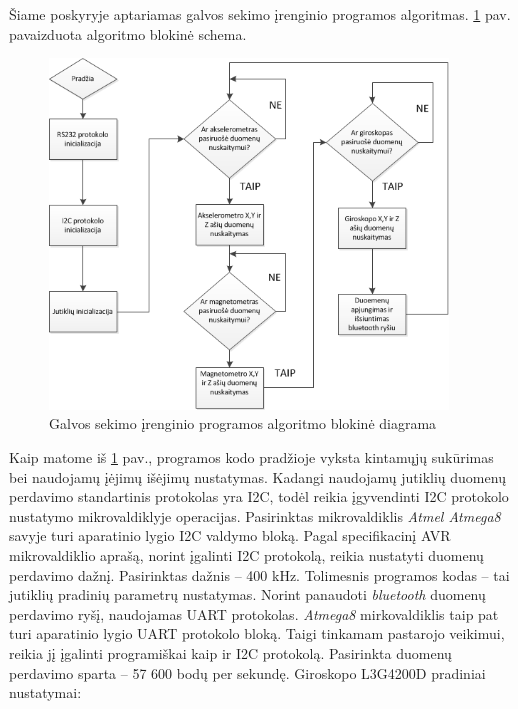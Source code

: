 \documentclass[]{vgtuef}
\begin{document}
{Šiame poskyryje aptariamas galvos sekimo įrenginio programos algoritmas. \ref{fig:head_tracker} pav. pavaizduota algoritmo blokinė schema.

\begin{figure}[!ht]
  \centering
  \includegraphics[width=400px]{img/head_tracker.png}
  \caption{Galvos sekimo įrenginio programos algoritmo blokinė diagrama}
  \label{fig:head_tracker}
\end{figure}

Kaip matome iš \ref{fig:head_tracker} pav., programos kodo pradžioje vyksta kintamųjų sukūrimas bei naudojamų įėjimų išėjimų nustatymas. Kadangi naudojamų jutiklių duomenų perdavimo standartinis protokolas yra I2C, todėl reikia įgyvendinti I2C protokolo nustatymo mikrovaldiklyje operacijas. Pasirinktas mikrovaldiklis \textit{Atmel Atmega8} savyje turi aparatinio lygio I2C valdymo bloką. Pagal specifikacinį AVR mikrovaldiklio aprašą, norint įgalinti I2C protokolą, reikia nustatyti duomenų perdavimo dažnį. Pasirinktas dažnis – 400 kHz. Tolimesnis programos kodas – tai jutiklių pradinių parametrų nustatymas. Norint panaudoti \textit{bluetooth} duomenų perdavimo ryšį, naudojamas UART protokolas. \textit{Atmega8} mirkovaldiklis taip pat turi aparatinio lygio UART protokolo bloką. Taigi tinkamam pastarojo veikimui, reikia jį įgalinti programiškai kaip ir I2C protokolą. Pasirinkta duomenų perdavimo sparta – 57 600 bodų per sekundę.
Giroskopo L3G4200D pradiniai nustatymai:

}
\end{document}
